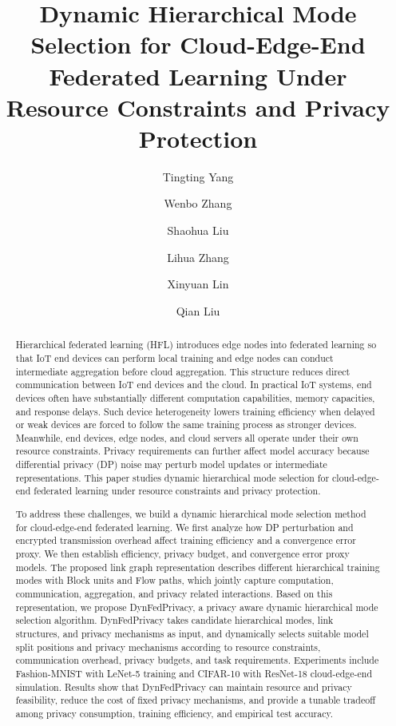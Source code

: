 ﻿\documentclass[preprint,12pt]{elsarticle}
\theoremstyle{plain}
\theoremstyle{definition}
\theoremstyle{remark}
\newcommand{\method}{DynFedPrivacy}
\begin{document}
\begin{frontmatter}

\title{Dynamic Hierarchical Mode Selection for Cloud-Edge-End Federated Learning Under Resource Constraints and Privacy Protection}

\author[bupt]{Tingting Yang}
\author[bupt]{Wenbo Zhang}
\author[bupt]{Shaohua Liu}
\author[bupt]{Lihua Zhang}
\author[bupt]{Xinyuan Lin}
\author[bupt]{Qian Liu}


\begin{abstract}
Hierarchical federated learning (HFL) introduces edge nodes into federated learning so that IoT end devices can perform local training and edge nodes can conduct intermediate aggregation before cloud aggregation.
This structure reduces direct communication between IoT end devices and the cloud.
In practical IoT systems, end devices often have substantially different computation capabilities, memory capacities, and response delays.
Such device heterogeneity lowers training efficiency when delayed or weak devices are forced to follow the same training process as stronger devices.
Meanwhile, end devices, edge nodes, and cloud servers all operate under their own resource constraints.
Privacy requirements can further affect model accuracy because differential privacy (DP) noise may perturb model updates or intermediate representations.
This paper studies dynamic hierarchical mode selection for cloud-edge-end federated learning under resource constraints and privacy protection.


To address these challenges, we build a dynamic hierarchical mode selection method for cloud-edge-end federated learning.
We first analyze how DP perturbation and encrypted transmission overhead affect training efficiency and a convergence error proxy.
We then establish efficiency, privacy budget, and convergence error proxy models.
The proposed link graph representation describes different hierarchical training modes with Block units and Flow paths, which jointly capture computation, communication, aggregation, and privacy related interactions.
Based on this representation, we propose \method{}, a privacy aware dynamic hierarchical mode selection algorithm.
\method{} takes candidate hierarchical modes, link structures, and privacy mechanisms as input, and dynamically selects suitable model split positions and privacy mechanisms according to resource constraints, communication overhead, privacy budgets, and task requirements.
Experiments include Fashion-MNIST with LeNet-5 training and CIFAR-10 with ResNet-18 cloud-edge-end simulation.
Results show that \method{} can maintain resource and privacy feasibility, reduce the cost of fixed privacy mechanisms, and provide a tunable tradeoff among privacy consumption, training efficiency, and empirical test accuracy.
\end{abstract}


\end{frontmatter}
\end{document}
